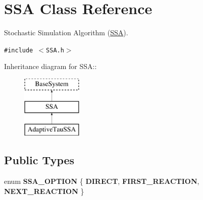 \hypertarget{class_s_s_a}{
\section{SSA Class Reference}
\label{class_s_s_a}
}
Stochastic Simulation Algorithm (\hyperlink{class_s_s_a}{SSA}).  


{\tt \#include $<$SSA.h$>$}

Inheritance diagram for SSA::\begin{figure}[H]
\begin{center}
\leavevmode
\includegraphics[height=3cm]{class_s_s_a}
\end{center}
\end{figure}
\subsection*{Public Types}
\begin{CompactItemize}
\item 
enum \textbf{SSA\_\-OPTION} \{ \textbf{DIRECT}, 
\textbf{FIRST\_\-REACTION}, 
\textbf{NEXT\_\-REACTION}
 \}
\end{CompactItemize}
